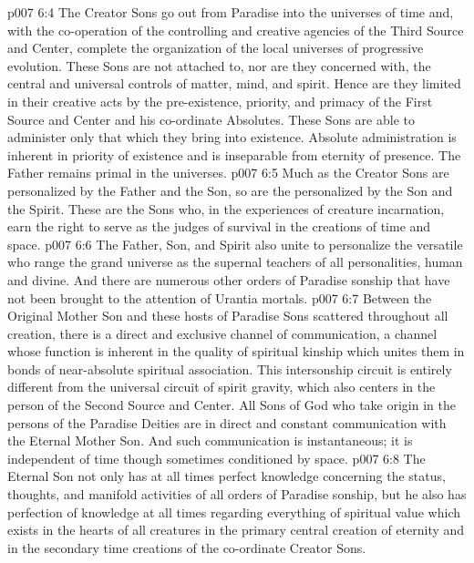 \vs p007 6:4 The Creator Sons go out from Paradise into the universes of time and, with the co\hyp{}operation of the controlling and creative agencies of the Third Source and Center, complete the organization of the local universes of progressive evolution. These Sons are not attached to, nor are they concerned with, the central and universal controls of matter, mind, and spirit. Hence are they limited in their creative acts by the pre\hyp{}existence, priority, and primacy of the First Source and Center and his co\hyp{}ordinate Absolutes. These Sons are able to administer only that which they bring into existence. Absolute administration is inherent in priority of existence and is inseparable from eternity of presence. The Father remains primal in the universes.
\vs p007 6:5 \pc Much as the Creator Sons are personalized by the Father and the Son, so are the  personalized by the Son and the Spirit. These are the Sons who, in the experiences of creature incarnation, earn the right to serve as the judges of survival in the creations of time and space.
\vs p007 6:6 \pc The Father, Son, and Spirit also unite to personalize the versatile  who range the grand universe as the supernal teachers of all personalities, human and divine. And there are numerous other orders of Paradise sonship that have not been brought to the attention of Urantia mortals.
\vs p007 6:7 \pc Between the Original Mother Son and these hosts of Paradise Sons scattered throughout all creation, there is a direct and exclusive channel of communication, a channel whose function is inherent in the quality of spiritual kinship which unites them in bonds of near\hyp{}absolute spiritual association. This intersonship circuit is entirely different from the universal circuit of spirit gravity, which also centers in the person of the Second Source and Center. All Sons of God who take origin in the persons of the Paradise Deities are in direct and constant communication with the Eternal Mother Son. And such communication is instantaneous; it is independent of time though sometimes conditioned by space.
\vs p007 6:8 The Eternal Son not only has at all times perfect knowledge concerning the status, thoughts, and manifold activities of all orders of Paradise sonship, but he also has perfection of knowledge at all times regarding everything of spiritual value which exists in the hearts of all creatures in the primary central creation of eternity and in the secondary time creations of the co\hyp{}ordinate Creator Sons.
